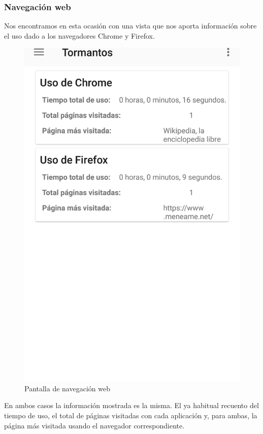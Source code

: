 \documentclass[12pt,a4paper,oneside]{book} %
\begin{document}
\subsubsection{Navegación web} 
Nos encontramos en esta ocasión con una vista que nos aporta información sobre el uso dado a los navegadores Chrome y Firefox. 
\begin{figure}[H]
	\begin{center}
     	\includegraphics[scale=0.2]{pictures/capsapp/browsing.png}
	    	\caption{Pantalla de navegación web}
    	\label{fig:Pantalla de navegacion web}
	\end{center}
\end{figure}
En ambos casos la información mostrada es la misma. El ya habitual recuento del tiempo de uso, el total de páginas visitadas con cada aplicación y, para ambas, la página más visitada usando el navegador correspondiente. 
\end{document}
